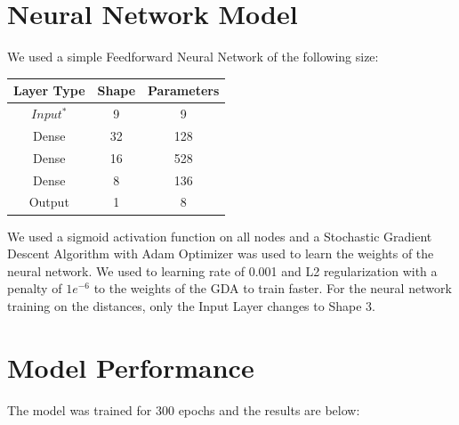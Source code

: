 \documentclass{article}
\begin{document}
\section{Neural Network Model}
\begin{flushleft}
    We used a simple Feedforward Neural Network of the following size:

    \begin{center}
        \begin{tabular}{ |c|c|c| }
            \hline
            Layer Type & Shape & Parameters \\
            \hline
            $Input^*$  & 9     & 9          \\
            Dense      & 32    & 128        \\
            Dense      & 16    & 528        \\
            Dense      & 8     & 136        \\
            Output     & 1     & 8          \\
            \hline
        \end{tabular}
    \end{center}

    We used a sigmoid activation function on all nodes and a Stochastic Gradient Descent Algorithm with Adam Optimizer was used to learn the weights of
    the neural network. We used to learning rate of 0.001 and L2 regularization with a penalty of $1e^{-6}$ to the weights of the GDA to train faster.
    For the neural network training on the distances, only the Input Layer changes to Shape 3.
\end{flushleft}

\section{Model Performance}
\begin{flushleft}
    The model was trained for 300 epochs and the results are below: \newline
\end{flushleft}
\end{document}
